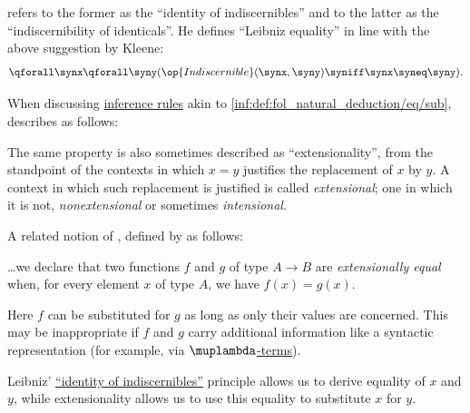 \begin{remark}
   refers to the former as the \enquote{identity of indiscernibles} and to the latter as the \enquote{indiscernibility of identicals}. He defines \enquote{Leibniz equality} in line with the above suggestion by Kleene:
  \begin{equation}\label{eq:rem:identity_of_indiscernibles/bi}
    \qforall \synx \qforall \syny (\op{Indiscernible}(\synx, \syny) \syniff \synx \syneq \syny).
  \end{equation}
\end{remark}

\begin{concept}\label{con:extensionality}
  When discussing \hyperref[def:inference_rule]{inference rules} akin to \ref{inf:def:fol_natural_deduction/eq/sub},  describes  as follows:
  \begin{displayquote}
    The same property is also sometimes described as \enquote{extensionality}, from the standpoint of the contexts in which \( x = y \) justifies the replacement of \( x \) by \( y \). A context in which such replacement is justified is called \textit{extensional}; one in which it is not, \textit{nonextensional} or sometimes \textit{intensional}.
  \end{displayquote}

  A related notion of , defined by  as follows:
  \begin{displayquote}
    \ldots we declare that two functions \( f \) and \( g \) of type \( A \to B \) are \textit{extensionally equal} when, for every element \( x \) of type \( A \), we have \( f(x) = g(x) \).
  \end{displayquote}

  Here \( f \) can be substituted for \( g \) as long as only their values are concerned. This may be inappropriate if \( f \) and \( g \) carry additional information like a syntactic representation (for example, via \hyperref[def:lambda_term]{\( \muplambda \)-terms}).
\end{concept}
\begin{comments}
  \item Leibniz' \hyperref[rem:identity_of_indiscernibles]{\enquote{identity of indiscernibles}} principle allows us to derive equality of \( x \) and \( y \), while extensionality allows us to use this equality to substitute \( x \) for \( y \).
\end{comments}

